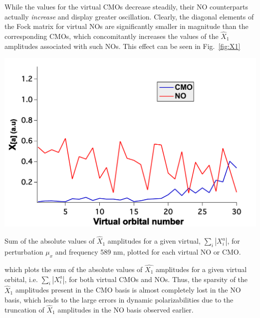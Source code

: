 While the values for the virtual CMOs decrease steadily, their NO counterparts actually {\em increase}
and display greater oscillation.  Clearly, the diagonal elements of the Fock
matrix for virtual NOs are significantly smaller in magnitude than the
corresponding CMOs, which concomitantly increases the values of the
$\hat{X}_1$ amplitudes associated with such NOs.  This effect can be seen in
Fig.~\ref{fig:X1} 
\begin{MyFigure}[h!]
\centering
\includegraphics[width=0.6\linewidth,natwidth=610,natheight=642]{figures_fvno/X1.pdf}
\caption{{\footnotesize  Sum of the absolute values of $\hat{X}_1$
amplitudes for a given virtual, $\sum_i \left|X_i^a\right|$, for perturbation $\mu_x$
and frequency 589 nm, plotted for each virtual NO or CMO.}}
\label{fig:X1}
\end{MyFigure}
which plots the sum of the absolute values of $\hat{X_1}$
amplitudes for a given virtual orbital, i.e.  $\sum_i |X_i^a|$, for both
virtual CMOs and NOs.  Thus, the sparsity of the $\hat{X}_1$ amplitudes present in the
CMO basis is almost completely lost in the NO basis, which leads to the large
errors in dynamic polarizabilities due to the truncation of $\hat{X}_1$
amplitudes in the NO basis observed earlier.  

